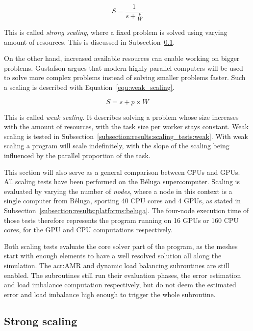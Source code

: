\begin{equation} \label{equ:strong_scaling}
	S = \frac{1}{s + \frac{p}{W}}
\end{equation}

This is called \textit{strong scaling}, where a fixed problem is solved using varying amount of
resources. This is discussed in Subsection~\ref{subsection:results:scaling_tests:strong}.

On the other hand, increased available resources can enable working on bigger problems. Gustafson
argues that modern highly parallel computers will be used to solve more complex problems instead of
solving smaller problems faster. Such a scaling is described with Equation~\ref{equ:weak_scaling}.

\begin{equation} \label{equ:weak_scaling}
	S = s + p \times W
\end{equation}

This is called \textit{weak scaling}. It describes solving a problem whose size increases with the
amount of resources, with the task size per worker stays constant. Weak scaling is tested in
Subsection~\ref{subsection:results:scaling_tests:weak}. With weak scaling a program will scale
indefinitely, with the slope of the scaling being influenced by the parallel proportion of the task.

This section will also serve as a general comparison between CPUs and GPUs. All scaling tests have
been performed on the Béluga supercomputer. Scaling is evaluated by varying the number of
\textit{nodes}, where a node in this context is a single computer from Béluga, sporting 40 CPU cores
and 4 GPUs, as stated in Subsection~\ref{subsection:results:platforms:beluga}. The four-node
execution time of those tests therefore represents the program running on 16 GPUs or 160 CPU cores,
for the GPU and CPU computations respectively.

Both scaling tests evaluate the core solver part of the program, as the meshes start with enough
elements to have a well resolved solution all along the simulation. The \acrlong{acr:AMR} and
dynamic load balancing subroutines are still enabled. The subroutines still run their evaluation
phases, the error estimation and load imbalance computation respectively, but do not deem the
estimated error and load imbalance high enough to trigger the whole subroutine. 

\subsection{Strong scaling} \label{subsection:results:scaling_tests:strong}

